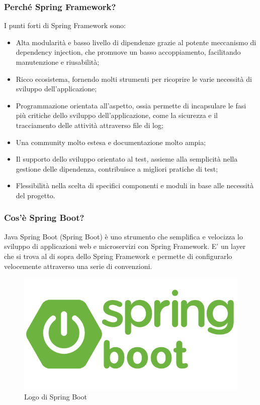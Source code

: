             \subsubsection{Perché Spring Framework? \cite{Spoclearn1}}
                I punti forti di Spring Framework sono:
                \begin{itemize}
                    \item Alta modularità e basso livello di dipendenze grazie al potente meccanismo di dependency injection, che promuove un basso accoppiamento, facilitando manutenzione e riusabilità;
                    \item  Ricco ecosistema, fornendo molti strumenti per ricoprire le varie necessità di sviluppo dell'applicazione;
                    \item Programmazione orientata all'aspetto, ossia permette di incapsulare le fasi più critiche dello sviluppo dell'applicazione, come la sicurezza e il tracciamento delle attività attraverso file di log;
                    \item Una community molto estesa e documentazione molto ampia;
                    \item Il supporto dello sviluppo orientato al test, assieme alla semplicità nella gestione delle dipendenza, contribuisce a migliori pratiche di test;
                    \item Flessibilità nella scelta di specifici componenti e moduli in base alle necessità del progetto.
                \end{itemize}
                
            \subsubsection{Cos'è Spring Boot? \cite{IBM2}}
                Java Spring Boot (Spring Boot) è uno strumento che semplifica e velocizza lo sviluppo di applicazioni web e microservizi con Spring Framework. E' un layer che si trova al di sopra dello Spring Framework e permette di configurarlo velocemente attraverso una serie di convenzioni.
                \begin{figure}[htbp!]
                    \centering
                    \includegraphics[width=0.44\linewidth]{Immagini/System Design/Spring Boot.png}
                    \caption{Logo di Spring Boot}
                \end{figure}
